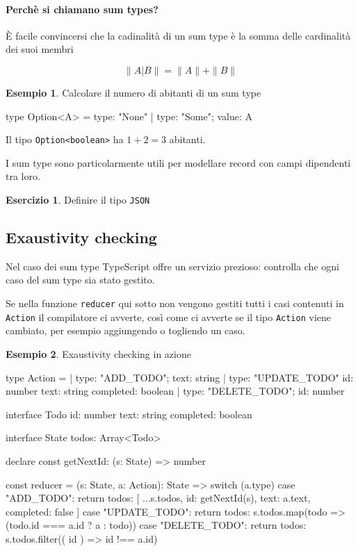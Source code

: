 \documentclass[12pt]{article}
\theoremstyle{definition}
\newtheorem{example}{Esempio}[subsection]
\newtheorem{exercise}{Esercizio}[subsection]
\newenvironment{code}
  {\vspace{0.5cm} \VerbatimEnvironment\begin{typescriptcode}}
  {\end{typescriptcode} \vspace{0.2cm}}
\begin{document}
\paragraph{Perchè si chiamano sum types?}

È facile convincersi che la cadinalità di un sum type è la somma delle cardinalità dei suoi membri

$$
\|A | B\| = \|A\| + \|B\|
$$

\begin{example}
Calcolare il numero di abitanti di un sum type

\begin{code}
type Option<A> = { type: "None" } | { type: "Some"; value: A }
\end{code}

Il tipo \texttt{Option<boolean>} ha $1 + 2 = 3$ abitanti.
\end{example}

I sum type sono particolarmente utili per modellare record con campi dipendenti tra loro.

\begin{exercise}
Definire il tipo \texttt{JSON}
\end{exercise}

\subsection{Exaustivity checking}

Nel caso dei sum type TypeScript offre un servizio prezioso: controlla che ogni caso del sum type sia stato gestito.

Se nella funzione \texttt{reducer} qui sotto non vengono gestiti tutti i casi contenuti in \texttt{Action} il compilatore ci avverte, così come
ci avverte se il tipo \texttt{Action} viene cambiato, per esempio aggiungendo o togliendo un caso.

\begin{example}
Exaustivity checking in azione

\begin{code}
type Action =
  | { type: "ADD_TODO"; text: string }
  | {
      type: "UPDATE_TODO"
      id: number
      text: string
      completed: boolean
    }
  | { type: "DELETE_TODO"; id: number }

interface Todo {
  id: number
  text: string
  completed: boolean
}

interface State {
  todos: Array<Todo>
}

declare const getNextId: (s: State) => number

const reducer = (s: State, a: Action): State => {
  switch (a.type) {
    case "ADD_TODO":
      return {
        todos: [
          ...s.todos,
          { id: getNextId(s), text: a.text, completed: false }
        ]
      }
    case "UPDATE_TODO":
      return {
        todos: s.todos.map(todo =>
          (todo.id === a.id ? a : todo))
      }
    case "DELETE_TODO":
      return {
        todos: s.todos.filter(({ id }) => id !== a.id)
      }
  }
}
\end{code}
\end{example}
\end{document}
